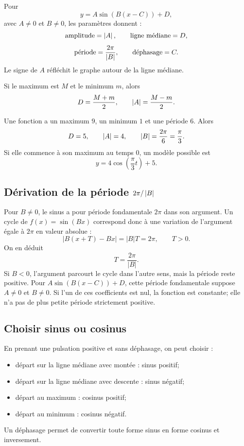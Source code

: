 Pour
\[
y=A\sin(B(x-C))+D,
\]
avec $A\ne0$ et $B\ne0$, les paramètres donnent :
\[
\text{amplitude}=\left\lvert A\right\rvert,
\qquad
\text{ligne médiane}=D,
\]
\[
\text{période}=\frac{2\pi}{\left\lvert B\right\rvert},
\qquad
\text{déphasage}=C.
\]
Le signe de $A$ réfléchit le graphe autour de la ligne médiane.

Si le maximum est $M$ et le minimum $m$, alors
\[
D=\frac{M+m}{2},
\qquad
\left\lvert A\right\rvert=\frac{M-m}{2}.
\]

\begin{examplebox}
Une fonction a un maximum $9$, un minimum $1$ et une période $6$. Alors
\[
D=5,
\qquad \left\lvert A\right\rvert=4,
\qquad \left\lvert B\right\rvert=\frac{2\pi}{6}=\frac\pi3.
\]
Si elle commence à son maximum au temps $0$, un modèle possible est
\[
y=4\cos\left(\frac\pi3t\right)+5.
\]
\end{examplebox}

\subsection{Dérivation de la période \texorpdfstring{$2\pi/\left\lvert B\right\rvert$}{2 pi sur valeur absolue de B}}

Pour \(B\ne0\), le sinus a pour période fondamentale \(2\pi\) dans son argument. Un cycle de \(f(x)=\sin(Bx)\) correspond donc à une variation de l'argument égale à \(2\pi\) en valeur absolue :
\[
|B(x+T)-Bx|=|B|T=2\pi,\qquad T>0.
\]
On en déduit
\[
T=\frac{2\pi}{|B|}.
\]
Si \(B<0\), l'argument parcourt le cycle dans l'autre sens, mais la période reste positive. Pour \(A\sin(B(x-C))+D\), cette période fondamentale suppose \(A\ne0\) et \(B\ne0\). Si l'un de ces coefficients est nul, la fonction est constante; elle n'a pas de plus petite période strictement positive.

\subsection{Choisir sinus ou cosinus}

En prenant une pulsation positive et sans déphasage, on peut choisir :
\begin{itemize}
\item départ sur la ligne médiane avec montée : sinus positif;
\item départ sur la ligne médiane avec descente : sinus négatif;
\item départ au maximum : cosinus positif;
\item départ au minimum : cosinus négatif.
\end{itemize}
Un déphasage permet de convertir toute forme sinus en forme cosinus et inversement.

